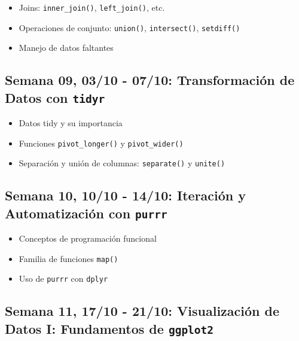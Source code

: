 \documentclass[11pt,letter,]{article}
\providecommand{\tightlist}{%
  \setlength{\itemsep}{0pt}\setlength{\parskip}{0pt}}
\begin{document}
\begin{itemize}
\tightlist
\item
  Joins: \texttt{inner\_join()}, \texttt{left\_join()}, etc.
\item
  Operaciones de conjunto: \texttt{union()}, \texttt{intersect()},
  \texttt{setdiff()}
\item
  Manejo de datos faltantes
\end{itemize}

\hypertarget{semana-09-0310---0710-transformaciuxf3n-de-datos-con-tidyr}{%
\subsection{\texorpdfstring{Semana 09, 03/10 - 07/10: Transformación de
Datos con
\texttt{tidyr}}{Semana 09, 03/10 - 07/10: Transformación de Datos con tidyr}}\label{semana-09-0310---0710-transformaciuxf3n-de-datos-con-tidyr}}

\begin{itemize}
\tightlist
\item
  Datos tidy y su importancia
\item
  Funciones \texttt{pivot\_longer()} y \texttt{pivot\_wider()}
\item
  Separación y unión de columnas: \texttt{separate()} y \texttt{unite()}
\end{itemize}

\hypertarget{semana-10-1010---1410-iteraciuxf3n-y-automatizaciuxf3n-con-purrr}{%
\subsection{\texorpdfstring{Semana 10, 10/10 - 14/10: Iteración y
Automatización con
\texttt{purrr}}{Semana 10, 10/10 - 14/10: Iteración y Automatización con purrr}}\label{semana-10-1010---1410-iteraciuxf3n-y-automatizaciuxf3n-con-purrr}}

\begin{itemize}
\tightlist
\item
  Conceptos de programación funcional
\item
  Familia de funciones \texttt{map()}
\item
  Uso de \texttt{purrr} con \texttt{dplyr}
\end{itemize}

\hypertarget{semana-11-1710---2110-visualizaciuxf3n-de-datos-i-fundamentos-de-ggplot2}{%
\subsection{\texorpdfstring{Semana 11, 17/10 - 21/10: Visualización de
Datos I: Fundamentos de
\texttt{ggplot2}}{Semana 11, 17/10 - 21/10: Visualización de Datos I: Fundamentos de ggplot2}}\label{semana-11-1710---2110-visualizaciuxf3n-de-datos-i-fundamentos-de-ggplot2}}
\end{document}
